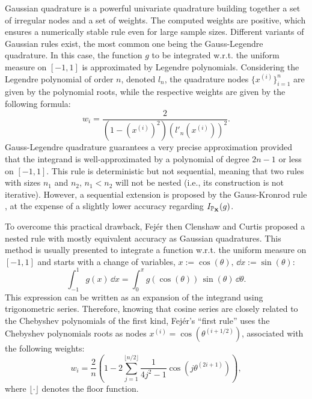 Gaussian quadrature is a powerful univariate quadrature building together a set of irregular nodes and a set of weights. 
The computed weights are positive, which ensures a numerically stable rule even for large sample sizes.
Different variants of Gaussian rules exist, the most common one being the Gauss-Legendre quadrature. 
In this case, the function $g$ to be integrated w.r.t. the uniform measure on $[-1, 1]$ is approximated by Legendre polynomials. 
Considering the Legendre polynomial of order $n$, denoted $l_n$, the quadrature nodes $\{x^{(i)}\}_{i=1}^n$ are given by the polynomial roots, while the respective weights are given by the following formula: 
\begin{equation}
    w_{i}={\frac {2}{\left(1-\left(x^{(i)}\right)^{2}\right)\left(l'_{n}(x^{(i)})\right)^{2}}}.
\end{equation}
Gauss-Legendre quadrature guarantees a very precise approximation provided that the integrand is well-approximated by a polynomial of degree $2n-1$ or less on $[-1, 1]$.
This rule is deterministic but not sequential, meaning that two rules with sizes $n_1$ and $n_2$, $n_1 < n_2$ will not be nested (i.e., its construction is not iterative). 
However, a sequential extension is proposed by the Gauss-Kronrod rule \citep{laurie_1997}, at the expense of a slightly lower accuracy regarding $I_{\mathbb{P}_{{\bf X}}}(g)$. 

To overcome this practical drawback, Fejér \citep{fejer_1933} then Clenshaw and Curtis \citep{clenshaw_1960} proposed a nested rule with mostly equivalent accuracy as Gaussian quadratures.
This method is usually presented to integrate a function w.r.t. the uniform measure on $[-1, 1]$ and starts with a change of variables, $x:=\cos(\theta), \, \dd x := \sin(\theta)$:
\begin{equation}
    \int_{-1}^{1} g(x) \, \dd x = \int_{0}^{\pi} g\left(\cos(\theta)\right) \, \sin(\theta) \, \dd \theta. 
\end{equation}
This expression can be written as an expansion of the integrand using trigonometric series. 
Therefore, knowing that cosine series are closely related to the Chebyshev polynomials of the first kind, 
Fejér's ``first rule'' \citep{trefethen_2008} uses the Chebyshev polynomials roots as nodes $x^{(i)} = \cos(\theta^{(i+1/2)})$, associated with the following weights:
\begin{equation}
    w_i=\frac{2}{n}\left(1-2\sum_{j=1}^{\lfloor n/2 \rfloor}\frac{1}{4j^2-1}\cos\left(j\theta^{(2i+1)}\right)\right),    
\end{equation}
where $\lfloor \cdot \rfloor$ denotes the floor function. 

